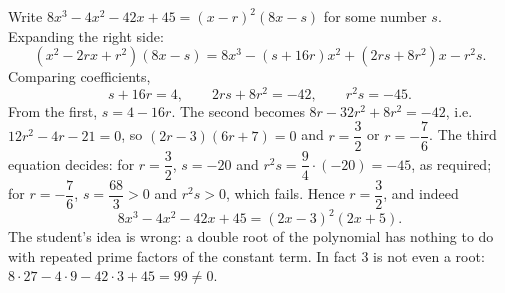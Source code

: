 Write $8x^3-4x^2-42x+45=(x-r)^2(8x-s)$ for some number $s$. Expanding the right side:
\[
(x^2-2rx+r^2)(8x-s)=8x^3-(s+16r)x^2+(2rs+8r^2)x-r^2s .
\]
Comparing coefficients,
\[
s+16r=4,\qquad 2rs+8r^2=-42,\qquad r^2s=-45 .
\]
From the first, $s=4-16r$. The second becomes $8r-32r^2+8r^2=-42$, i.e.\ $12r^2-4r-21=0$, so $(2r-3)(6r+7)=0$ and $r=\dfrac{3}{2}$ or $r=-\dfrac{7}{6}$. The third equation decides: for $r=\dfrac{3}{2}$, $s=-20$ and $r^2s=\dfrac{9}{4}\cdot(-20)=-45$, as required; for $r=-\dfrac{7}{6}$, $s=\dfrac{68}{3}>0$ and $r^2s>0$, which fails. Hence $r=\boxed{\dfrac{3}{2}}$, and indeed
\[
8x^3-4x^2-42x+45=(2x-3)^2(2x+5).
\]
The student's idea is wrong: a double root of the polynomial has nothing to do with repeated prime factors of the constant term. In fact $3$ is not even a root: $8\cdot27-4\cdot9-42\cdot3+45=99\ne0$.
